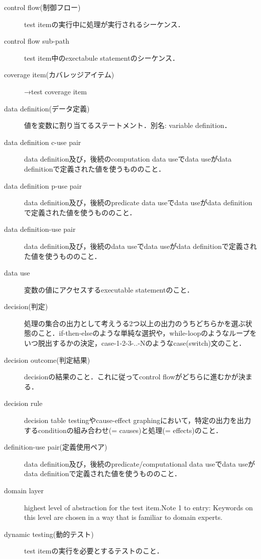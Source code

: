 \begin{description}
    \item[control flow(制御フロー)]test itemの実行中に処理が実行されるシーケンス．
    \item[control flow sub-path]test item中のexectabule statementのシーケンス．
    \item[coverage item(カバレッジアイテム)]→test coverage item
    \item[data definition(データ定義)]値を変数に割り当てるステートメント．別名: variable definition．
    \item[data definition c-use pair]data definition及び，後続のcomputation data useでdata useがdata definitionで定義された値を使うもののこと．
    \item[data definition p-use pair]data definition及び，後続のpredicate data useでdata useがdata definitionで定義された値を使うもののこと．
    \item[data definition-use pair]data definition及び，後続のdata useでdata useがdata definitionで定義された値を使うもののこと．
    \item[data use]変数の値にアクセスするexecutable statementのこと．
    \item[decision(判定)]処理の集合の出力として考えうる2つ以上の出力のうちどちらかを選ぶ状態のこと．if-then-elseのような単純な選択や，while-loopのようなループをいつ脱出するかの決定，case-1-2-3-..-Nのようなcase(switch)文のこと．
    \item[decision outcome(判定結果)]decisionの結果のこと．これに従ってcontrol flowがどちらに進むかが決まる．
    \item[decision rule]decision table testingやcause-effect graphingにおいて，特定の出力を出力するconditionの組み合わせ(= causes)と処理(= effects)のこと．
    \item[definition-use pair(定義使用ペア)]data definition及び，後続のpredicate/computational data useでdata useがdata definitionで定義された値を使うもののこと．
    \item[domain layer]highest level of abstraction for the test item.Note 1 to entry: Keywords on this level are chosen in a way that is familiar to domain experts.
    \item[dynamic testing(動的テスト)]test itemの実行を必要とするテストのこと．

\end{description}

